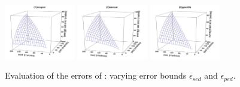 {\begin{figure}[tb!]
	\centering
	\includegraphics[width= 0.275\textwidth]{figures/Fig-BITT-mopsi-sed-error.png}\hspace{4ex}
	\includegraphics[width= 0.275\textwidth]{figures/Fig-BITT-sercar-sed-error.png}\hspace{4ex}
	\includegraphics[width= 0.275\textwidth]{figures/Fig-BITT-geolife-sed-error.png}\hspace{0ex}
	\vspace{-3ex}
	\caption{\small Evaluation of the \sed errors of \bitt: varying error bounds $\epsilon_{sed}$ and $\epsilon_{ped}$.}
	\label{fig:bitt-sed-error}
	\vspace{-1ex}
\end{figure}



}
